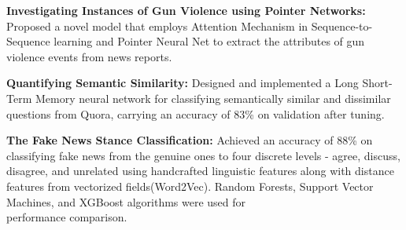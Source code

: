\begin{cventries}
\vspace{-5mm}
  \cventry
    {}
    {}
    {}
    {}
    {
      \begin{cvitems}
      \item {{ \textbf{Investigating Instances of Gun Violence using Pointer Networks:} Proposed a novel model that employs Attention Mechanism in Sequence-to-Sequence learning and Pointer Neural Net to extract the attributes of gun violence events from news reports.}}
      \item {{ \textbf{Quantifying Semantic Similarity:} Designed and implemented a Long Short-Term Memory neural network for classifying semantically similar and dissimilar questions from Quora, carrying an accuracy of 83\% on validation after tuning.}}
      \item { \textbf{The Fake News Stance Classification:} Achieved an accuracy of 88\% on classifying fake news from the genuine ones to four discrete levels - agree, discuss, disagree, and unrelated using handcrafted linguistic features along with distance features from vectorized fields(Word2Vec). Random Forests, Support Vector Machines, and XGBoost algorithms were used for \\ performance comparison.}
      \end{cvitems}
    }
\end{cventries}
